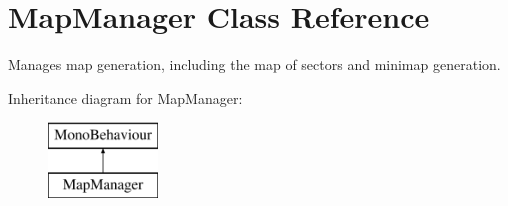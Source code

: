 \hypertarget{class_map_manager}{}\section{Map\+Manager Class Reference}
\label{class_map_manager}


Manages map generation, including the map of sectors and minimap generation.  


Inheritance diagram for Map\+Manager\+:\begin{figure}[H]
\begin{center}
\leavevmode
\includegraphics[height=2.000000cm]{class_map_manager}
\end{center}
\end{figure}
